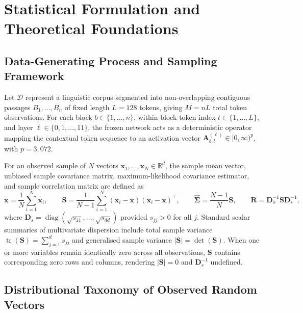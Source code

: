 \documentclass[12pt, a4paper, oneside]{report}
\theoremstyle{definition}
\newcommand{\vect}[1]{\mathbf{#1}}
\newcommand{\mat}[1]{\mathbf{#1}}
\newcommand{\tr}{\operatorname{tr}}
\newcommand{\diag}{\operatorname{diag}}
\newcommand{\R}{\mathbb{R}}
\begin{document}
\chapter{Statistical Formulation and Theoretical Foundations}

\section{Data-Generating Process and Sampling Framework}

Let $\mathcal{D}$ represent a linguistic corpus segmented into non-overlapping contiguous passages $B_1, \dots, B_n$ of fixed length $L = 128$ tokens, giving $M = n L$ total token observations. For each block $b \in \{1, \dots, n\}$, within-block token index $t \in \{1, \dots, L\}$, and layer $\ell \in \{0, 1, \dots, 11\}$, the frozen network acts as a deterministic operator mapping the contextual token sequence to an activation vector $\vect{A}_{b,t}^{(\ell)} \in [0, \infty)^p$, with $p = 3{,}072$.

For an observed sample of $N$ vectors $\vect{x}_1, \dots, \vect{x}_N \in \R^d$, the sample mean vector, unbiased sample covariance matrix, maximum-likelihood covariance estimator, and sample correlation matrix are defined as
\begin{equation}
    \bar{\vect{x}} = \frac{1}{N}\sum_{i=1}^{N} \vect{x}_i,
    \qquad
    \mat{S} = \frac{1}{N-1}\sum_{i=1}^{N} (\vect{x}_i - \bar{\vect{x}})(\vect{x}_i - \bar{\vect{x}})^\top,
    \qquad
    \hat{\mat{\Sigma}} = \frac{N-1}{N}\mat{S},
    \qquad
    \mat{R} = \mat{D}_s^{-1}\mat{S}\mat{D}_s^{-1},
    \label{eq:sample_moments}
\end{equation}
where $\mat{D}_s = \diag(\sqrt{s_{11}}, \dots, \sqrt{s_{dd}})$ provided $s_{jj} > 0$ for all $j$. Standard scalar summaries of multivariate dispersion include total sample variance $\tr(\mat{S}) = \sum_{j=1}^d s_{jj}$ and generalised sample variance $|\mat{S}| = \det(\mat{S})$. When one or more variables remain identically zero across all observations, $\mat{S}$ contains corresponding zero rows and columns, rendering $|\mat{S}| = 0$ and $\mat{D}_s^{-1}$ undefined.

\section{Distributional Taxonomy of Observed Random Vectors}
\end{document}
